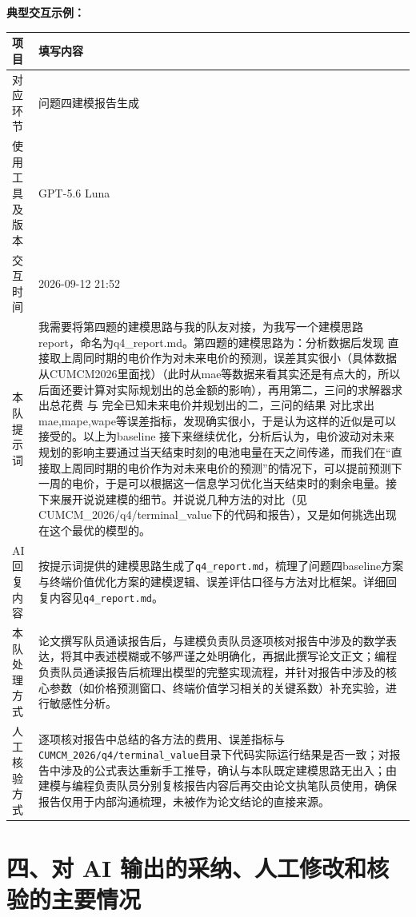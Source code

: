 \documentclass[12pt, a4paper, scheme=chinese, fontset=windows]{ctexart}
\begin{document}
\textbf{典型交互示例：}
\begin{longtable}{p{3cm}p{10cm}}
\toprule
项目 & 填写内容 \\
\midrule
\endhead
对应环节 & 问题四建模报告生成 \\
使用工具及版本 & GPT-5.6 Luna \\
交互时间 & 2026-09-12 21:52 \\
本队提示词 & 我需要将第四题的建模思路与我的队友对接，为我写一个建模思路report，命名为q4\_report.md。第四题的建模思路为：分析数据后发现 直接取上周同时期的电价作为对未来电价的预测，误差其实很小（具体数据从CUMCM2026里面找）（此时从mae等数据来看其实还是有点大的，所以后面还要计算对实际规划出的总金额的影响），再用第二，三问的求解器求出总花费 与 完全已知未来电价并规划出的二，三问的结果 对比求出mae,mape,wape等误差指标，发现确实很小，于是认为这样的近似是可以接受的。以上为baseline
接下来继续优化，分析后认为，电价波动对未来规划的影响主要通过当天结束时刻的电池电量在天之间传递，而我们在“直接取上周同时期的电价作为对未来电价的预测”的情况下，可以提前预测下一周的电价，于是可以根据这一信息学习优化当天结束时的剩余电量。接下来展开说说建模的细节。并说说几种方法的对比（见CUMCM\_2026/q4/terminal\_value下的代码和报告），又是如何挑选出现在这个最优的模型的。 \\
AI 回复内容 & 按提示词提供的建模思路生成了\texttt{q4\_report.md}，梳理了问题四baseline方案与终端价值优化方案的建模逻辑、误差评估口径与方法对比框架。详细回复内容见\texttt{q4\_report.md}。 \\
本队处理方式 & 论文撰写队员通读报告后，与建模负责队员逐项核对报告中涉及的数学表达，将其中表述模糊或不够严谨之处明确化，再据此撰写论文正文；编程负责队员通读报告后梳理出模型的完整实现流程，并针对报告中涉及的核心参数（如价格预测窗口、终端价值学习相关的关键系数）补充实验，进行敏感性分析。 \\
人工核验方式 & 逐项核对报告中总结的各方法的费用、误差指标与\texttt{CUMCM\_2026/q4/terminal\_value}目录下代码实际运行结果是否一致；对报告中涉及的公式表达重新手工推导，确认与本队既定建模思路无出入；由建模与编程负责队员分别复核报告内容后再交由论文执笔队员使用，确保报告仅用于内部沟通梳理，未被作为论文结论的直接来源。 \\
\bottomrule
\end{longtable}

\bigskip

\section*{四、对 AI 输出的采纳、人工修改和核验的主要情况}
\end{document}
